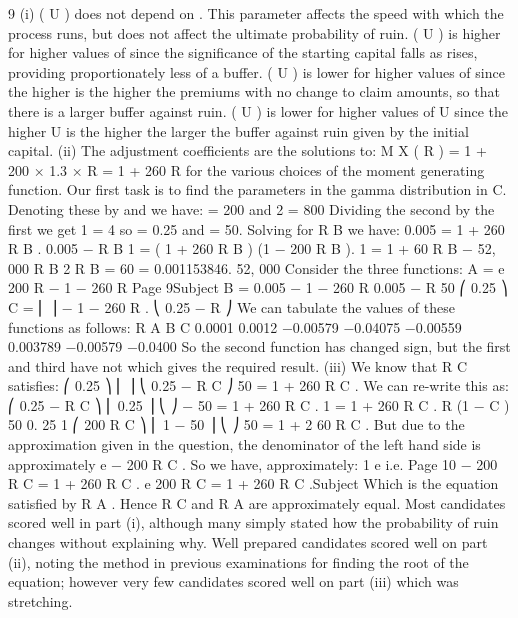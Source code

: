 \documentclass[a4paper,12pt]{article}
\begin{document}
9
(i)
\psi ( U )
does not depend on \lambda . This parameter affects the speed with which
the process runs, but does not affect the ultimate probability of ruin.
\psi ( U ) is higher for higher values of \mu  since the significance of the starting
capital falls as \mu  rises, providing proportionately less of a buffer.
\psi ( U ) is lower for higher values of \theta   since the higher \theta   is the higher the
premiums with no change to claim amounts, so that there is a larger buffer
against ruin.
\psi ( U ) is lower for higher values of U since the higher U is the higher the
larger the buffer against ruin given by the initial capital.
(ii)
The adjustment coefficients are the solutions to:
M X ( R ) = 1 + 200 × 1.3 × R = 1 + 260 R
for the various choices of the moment generating function.
Our first task is to find the parameters in the gamma distribution in C.
Denoting these by \alpha and \beta we have:
\alpha
\alpha
= 200 and 2 = 800
\beta
\beta
Dividing the second by the first we get 1 = 4 so \beta = 0.25 and \alpha = 50.
\beta
Solving for R B we have:
0.005
= 1 + 260 R B .
0.005 − R B
1 = ( 1 + 260 R B ) (1 − 200 R B ).
1 = 1 + 60 R B − 52, 000 R B 2
R B =
60
= 0.001153846.
52, 000
Consider the three functions:
A = e 200 R − 1 − 260 R
Page 9Subject %
B =
0.005
− 1 − 260 R
0.005 − R
50
⎛ 0.25 ⎞
C = ⎜
⎟ − 1 − 260 R .
⎝ 0.25 − R ⎠
We can tabulate the values of these functions as follows:
R A B C
0.0001
0.0012 −0.00579
−0.04075 −0.00559
0.003789 −0.00579
−0.0400
So the second function has changed sign, but the first and third have not which
gives the required result.
(iii)
We know that R C satisfies:
⎛ 0.25 ⎞
⎜
⎟
⎝ 0.25 − R C ⎠
50
= 1 + 260 R C .
We can re-write this as:
⎛ 0.25 − R C ⎞
⎜ 0.25 ⎟
⎝
⎠
− 50
= 1 + 260 R C .
1
= 1 + 260 R C .
R
(1 − C ) 50
0. 25
1
⎛ 200 R C ⎞
⎜ 1 − 50 ⎟
⎝
⎠
50
= 1 + 2 60 R C .
But due to the approximation given in the question, the denominator of the left
hand side is approximately e − 200 R C .
So we have, approximately:
1
e
i.e.
Page 10
− 200 R C
= 1 + 260 R C .
e 200 R C = 1 + 260 R C .Subject %
Which is the equation satisfied by R A . Hence R C and R A are approximately
equal.
Most candidates scored well in part (i), although many simply stated how the probability of
ruin changes without explaining why. Well prepared candidates scored well on part (ii),
noting the method in previous examinations for finding the root of the equation; however very
few candidates scored well on part (iii) which was stretching.
\end{document}
